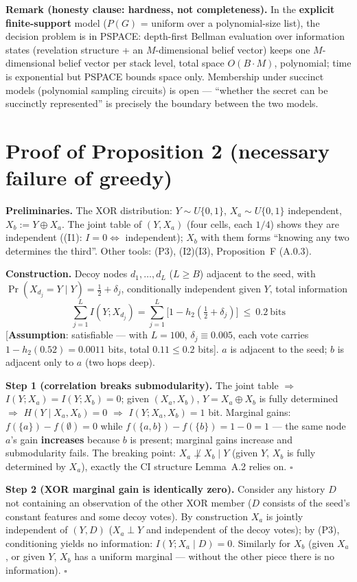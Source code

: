 \documentclass{article}
\providecommand{\qed}{\hfill$\square$}
\begin{document}
\textbf{Remark (honesty clause: hardness, not completeness).} In the \textbf{explicit finite-support} model ($P(G)$ = uniform over a polynomial-size list), the decision problem is in PSPACE: depth-first Bellman evaluation over information states (revelation structure + an $M$-dimensional belief vector) keeps one $M$-dimensional belief vector per stack level, total space $O(B\cdot M)$, polynomial; time is exponential but PSPACE bounds space only. Membership under succinct models (polynomial sampling circuits) is open --- ``whether the secret can be succinctly represented'' is precisely the boundary between the two models.

\section{Proof of Proposition 2 (necessary failure of greedy)}
\label{app:prop2}

\textbf{Preliminaries.} The XOR distribution: $Y\sim U\{0,1\}$, $X_a\sim U\{0,1\}$ independent, $X_b:=Y\oplus X_a$. The joint table of $(Y,X_a)$ (four cells, each $1/4$) shows they are independent ((I1): $I=0\iff$ independent); $X_b$ with them forms ``knowing any two determines the third''. Other tools: (P3), (I2)(I3), Proposition~F (A.0.3).

\textbf{Construction.} Decoy nodes $d_1,\dots,d_L$ ($L\ge B$) adjacent to the seed, with $\Pr(X_{d_j}{=}Y\mid Y)=\tfrac12+\delta_j$, conditionally independent given $Y$, total information
\[
\sum_{j=1}^L I(Y;X_{d_j})=\sum_{j=1}^L\big[1-h_2(\tfrac12+\delta_j)\big]\ \le\ 0.2\ \text{bits}
\]
[\textbf{Assumption}: satisfiable --- with $L=100$, $\delta_j\equiv0.005$, each vote carries $1-h_2(0.52)=0.0011$ bits, total $0.11\le0.2$ bits]. $a$ is adjacent to the seed; $b$ is adjacent only to $a$ (two hops deep).

\textbf{Step 1 (correlation breaks submodularity).} The joint table $\Rightarrow$ $I(Y;X_a)=I(Y;X_b)=0$; given $(X_a,X_b)$, $Y=X_a\oplus X_b$ is fully determined $\Rightarrow$ $H(Y\mid X_a,X_b)=0$ $\Rightarrow$ $I(Y;X_a,X_b)=1$ bit. Marginal gains: $f(\{a\})-f(\emptyset)=0$ while $f(\{a,b\})-f(\{b\})=1-0=1$ --- the same node $a$'s gain \textbf{increases} because $b$ is present; marginal gains increase and submodularity fails. The breaking point: $X_a\not\perp X_b\mid Y$ (given $Y$, $X_b$ is fully determined by $X_a$), exactly the CI structure Lemma~A.2 relies on. \qed{}

\textbf{Step 2 (XOR marginal gain is identically zero).} Consider any history $D$ not containing an observation of the other XOR member ($D$ consists of the seed's constant features and some decoy votes). By construction $X_a$ is jointly independent of $(Y,D)$ ($X_a\perp Y$ and independent of the decoy votes); by (P3), conditioning yields no information: $I(Y;X_a\mid D)=0$. Similarly for $X_b$ (given $X_a$, or given $Y$, $X_b$ has a uniform marginal --- without the other piece there is no information). \qed{}
\end{document}
